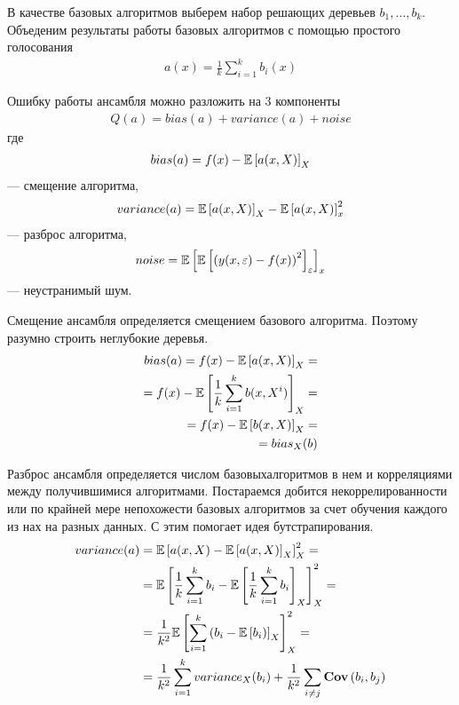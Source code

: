 В качестве базовых алгоритмов выберем набор решающих деревьев $b_1, \dots, b_k$.
Объеденим результаты работы базовых алгоритмов с помощью простого голосования
\begin{align}
	a(x) = \frac{1}{k} \sum_{i=1}^{k} b_i(x)
\end{align}

Ошибку работы ансамбля можно разложить на 3 компоненты
\begin{align}
	Q(a) = bias(a) + variance(a) + noise
\end{align}
где
\begin{align}
	bias(a) = f(x) - \mathbb{E}\left[a(x, X)\right]_X \\
\end{align} 
--- смещение алгоритма,
\begin{align}
	variance(a) = \mathbb{E}\left[a(x, X)\right]_X -\mathbb{E}\left[a(x, X)\right]_x^2 \\
\end{align}
--- разброс алгоритма,
\begin{align}
	noise = \mathbb{E}\left[\mathbb{E}\left[\left( y(x, \varepsilon) - f(x) \right)^2\right]_{\varepsilon}\right]_x
\end{align}
--- неустранимый шум.

Смещение ансамбля определяется смещением базового алгоритма. Поэтому разумно строить неглубокие деревья.
\begin{align}
	bias(a) = 
	f(x) - \mathbb{E}\left[a(x, X)\right]_X = \\
	= f(x) - \mathbb{E}\left[\frac{1}{k} \sum_{i=1}^{k} b(x, X^i)\right]_X = \\
	= f(x) - \mathbb{E}\left[b(x, X)\right]_X = \\
	= bias_X(b)
\end{align}

Разброс ансамбля определяется числом базовыхалгоритмов в нем и корреляциями между получившимися алгоритмами.
Постараемся добится некоррелированности или по крайней мере непохожести базовых алгоритмов за счет обучения
каждого из нах на разных данных. С этим помогает идея бутстрапирования.
\begin{align}
	variance(a) & = \mathbb{E}\left[a(x, X) - \mathbb{E}\left[a(x, X)\right]_X \right]_X^2 = \\
	& = \mathbb{E}\left[\frac{1}{k} \sum_{i=1}^{k} b_i - \mathbb{E}\left[\frac{1}{k} \sum_{i=1}^{k} b_i \right]_X \right]_X^2 = \\
	& = \frac{1}{k^2} \mathbb{E}\left[\sum_{i=1}^{k} \left( b_i - \mathbb{E}\left[b_i \right)\right]_X \right]_X^2 = \\
	& = \frac{1}{k^2} \sum_{i=1}^{k} variance_X(b_i) + 
	\frac{1}{k^2} \sum_{i \ne j} \textbf{Cov}\left(b_i, b_j\right)
\end{align}

